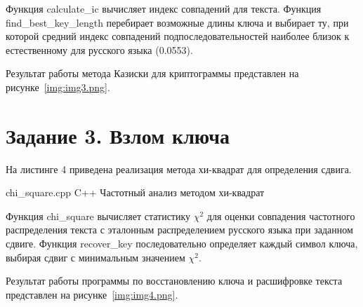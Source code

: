 Функция calculate\_ic вычисляет индекс совпадений для текста. Функция find\_best\_key\_length перебирает возможные длины ключа и выбирает ту, при которой средний индекс совпадений подпоследовательностей наиболее близок к естественному для русского языка (0.0553).

Результат работы метода Казиски для криптограммы представлен на рисунке~\ref{img:img3.png}.


\section*{Задание 3. Взлом ключа}

На листинге 4 приведена реализация метода хи-квадрат для определения сдвига.

    {chi_square.cpp}
    {C++}
    {Частотный анализ методом хи-квадрат}

Функция chi\_square вычисляет статистику $\chi^2$ для оценки совпадения частотного распределения текста с эталонным распределением русского языка при заданном сдвиге. Функция recover\_key последовательно определяет каждый символ ключа, выбирая сдвиг с минимальным значением $\chi^2$.

Результат работы программы по восстановлению ключа и расшифровке текста представлен на рисунке~\ref{img:img4.png}.

